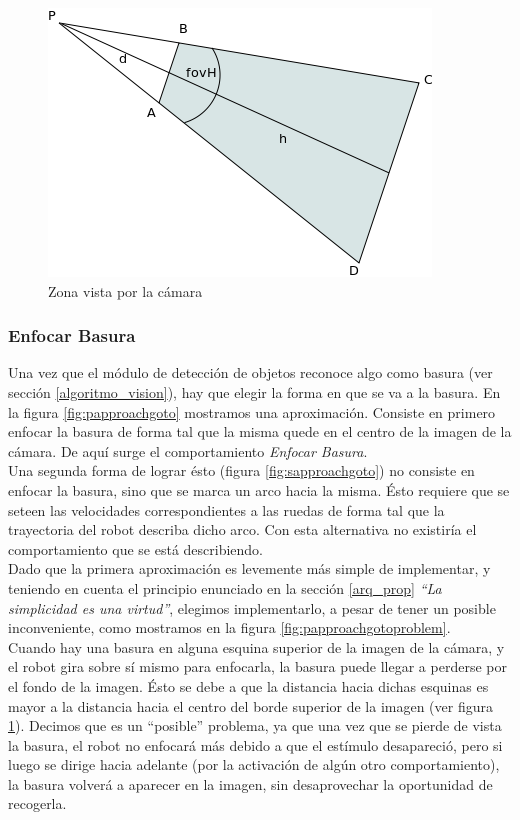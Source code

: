 \begin{figure}[htp]
\begin{center}
\includegraphics[scale=0.5]{comportamientos/figures/rectangleWander.png}
\caption{Zona vista por la c\'amara}
\label{fig:zoneCamera}
\end{center}
\end{figure}

\subsubsection{Enfocar Basura}
\label{focus_garbage}
Una vez que el m\'odulo de detecci\'on de objetos reconoce algo como basura
(ver secci\'on \ref{algoritmo_vision}), hay que elegir
la forma en que se va a la basura. En la figura \ref{fig:papproachgoto}
mostramos una aproximaci\'on. Consiste en primero enfocar la
basura de forma tal que la misma quede en el centro de la imagen de la
c\'amara. De aqu\'i surge el comportamiento \emph{Enfocar Basura}.
\\\indent
Una segunda forma de lograr \'esto (figura \ref{fig:sapproachgoto}) no consiste
en enfocar la basura, sino que se marca un arco hacia la misma. \'Esto requiere
que se seteen las velocidades correspondientes a las ruedas de forma tal que la
trayectoria del robot describa dicho arco. Con esta alternativa no
existir\'ia el comportamiento que se est\'a describiendo.
\\\indent
Dado que la primera aproximaci\'on es levemente m\'as simple de implementar, y
teniendo en cuenta el principio enunciado en la secci\'on \ref{arq_prop}
\emph{``La simplicidad es una virtud''}, elegimos implementarlo, a
pesar de tener un posible inconveniente, como mostramos en la figura
\ref{fig:papproachgotoproblem}.
\\\indent
Cuando hay una basura en alguna esquina superior de la imagen de la c\'amara,
y el robot gira sobre s\'i mismo para enfocarla, la basura puede llegar a
perderse por el fondo de la imagen. \'Esto se debe a que la distancia hacia
dichas esquinas es mayor a la distancia hacia el centro del borde superior de
la imagen (ver figura \ref{fig:zoneCamera}). Decimos que es un ``posible''
problema, ya que una vez que se pierde de vista la basura, el robot no
enfocar\'a m\'as debido a que el est\'imulo desapareci\'o, pero si luego se
dirige hacia adelante (por la activaci\'on de alg\'un otro comportamiento), la
basura volver\'a a aparecer en la imagen, sin desaprovechar la oportunidad de
recogerla.

